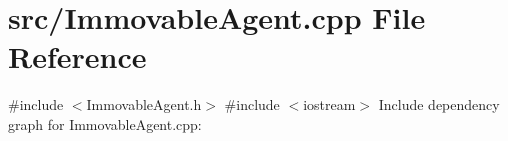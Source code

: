 \section{src/\+Immovable\+Agent.cpp File Reference}
\label{_immovable_agent_8cpp}
{\ttfamily \#include $<$Immovable\+Agent.\+h$>$}\newline
{\ttfamily \#include $<$iostream$>$}\newline
Include dependency graph for Immovable\+Agent.\+cpp\+:
